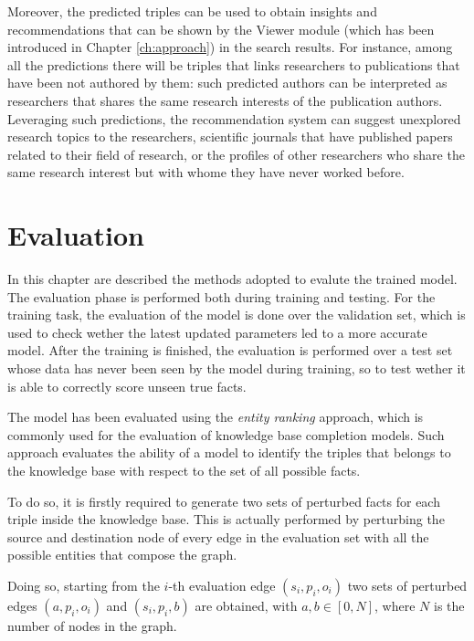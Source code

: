 \documentclass[%
    corpo=13.5pt,
    twoside,
    oldstyle,
    tipotesi=magistrale,
    greek,
    evenboxes
]{toptesi}
\begin{document}
Moreover, the predicted triples can be used to obtain insights and
recommendations that can be shown by the Viewer module (which has been
introduced in Chapter \ref{ch:approach}) in the search results.
For instance, among all the predictions there will be triples that links
researchers to publications that have been not authored by them: such
predicted authors can be interpreted as researchers that
shares the same research interests of the publication authors.
Leveraging such predictions, the recommendation system can suggest
unexplored research topics to the researchers, scientific journals that
have published papers related to their field of research, or
the profiles of other researchers who share the same research interest but
with whome they have never worked before.



\chapter{Evaluation}

In this chapter are described the methods adopted to evalute the trained
model.
The evaluation phase is performed both during training and testing.
For the training task, the evaluation of the model is done over the
validation set, which is used to check wether the latest updated parameters
led to a more accurate model.
After the training is finished, the evaluation is performed over a test set
whose data has never been seen by the model during training, so to test
wether it is able to correctly score unseen true facts.

The model has been evaluated using the \emph{entity ranking} approach, which is
commonly used for the evaluation of knowledge base completion models.
Such approach evaluates the ability of a model to identify the triples that
belongs to the knowledge base with respect to the set of all possible facts.

To do so, it is firstly required to generate two sets of perturbed facts for
each triple inside the knowledge base.
This is actually performed by perturbing the source and destination
node of every edge in the evaluation set with all the possible entities
that compose the graph.

Doing so, starting from the $i$-th evaluation edge $(s_i,p_i,o_i)$
two sets of perturbed edges $(a,p_i,o_i)$ and $(s_i,p_i,b)$ are obtained, with
$a,b \in [0, N]$, where $N$ is the number of nodes in the graph.
\end{document}

